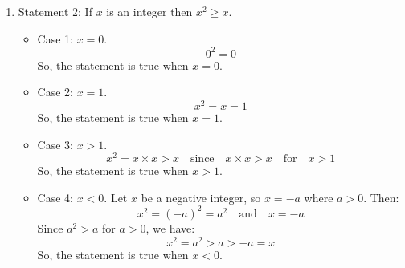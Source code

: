\documentclass{article}
\begin{document}
\begin{enumerate}
    \item Statement 2: If $x$ is an integer then $x^2 \geq x$.
          \begin{itemize}
              \item Case 1: $x = 0$.
                    \[
                        0^2 = 0
                    \]
                    So, the statement is true when $x = 0$.
              \item Case 2: $x = 1$.
                    \[
                        x^2 = x = 1
                    \]
                    So, the statement is true when $x = 1$.
              \item Case 3: $x > 1$.
                    \[
                        x^2 = x \times x > x \quad \text{since} \quad x \times x > x \quad \text{for} \quad x > 1
                    \]
                    So, the statement is true when $x > 1$.
              \item Case 4: $x < 0$.\newline
                    Let \(x\) be a negative integer, so \(x = -a\) where \(a > 0\). Then:
                    \[
                        x^2 = {(-a)}^2 = a^2 \quad \text{and} \quad x = -a
                    \]
                    Since \(a^2 > a\) for \(a > 0\), we have:
                    \[
                        x^2 = a^2 > a > -a = x
                    \]
                    So, the statement is true when $x < 0$.


\end{itemize}
\end{enumerate}
\end{document}
